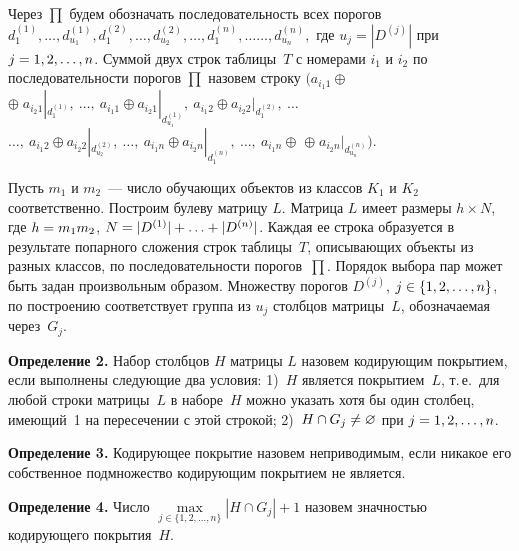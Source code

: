 \begin{multicols}{2}
Через $\prod$ будем обозначать последовательность всех порогов
$d^{(1)}_1,\ldots ,d^{(1)}_{u_1}, d^{(2)}_1,\ldots ,d^{(2)}_{u_2},\ldots , 
d^{(n)}_1,\ldots$\linebreak $\ldots ,d^{(n)}_{u_n},$ 
где 
$u_j = |D^{(j)}|$ при $j\hm=1,2,\ldots ,n$. Суммой двух строк таблицы~$T$ 
с номерами $i_1$ и $i_2$ по последовательности порогов
$\prod$ назовем строку
$(a_{{i_1}1} \oplus$\linebreak $\oplus\;a_{{i_2}1} |_{d^{(1)}_1},\ \ldots ,\ a_{{i_1}1} \oplus 
a_{{i_2}1} |_{d^{(1)}_{u_1}},\
a_{{i_1}2} \oplus a_{{i_2}2} |_{d^{(2)}_1},\ \ldots$\linebreak 
$\ldots ,\ a_{{i_1}2} \oplus a_{{i_2}2} |_{d^{(2)}_{u_2}},\
\ldots ,\
a_{{i_1}n} \oplus a_{{i_2}n} |_{d^{(n)}_{1}},\ \ldots ,\ a_{{i_1}n} \oplus $\linebreak
$\oplus\;a_{{i_2}n} |_{d^{(n)}_{u_n}})$.

Пусть $m_1$ и $m_2$~--- число обучающих объектов из классов $K_1$ и
$K_2$ соответственно. Построим булеву матрицу $L$. Матрица $L$ имеет
размеры $h \times N$, где $h \hm= m_1m_2$, $N\hm=|D^{(1)}|+\ldots +|D^{(n)}|$.
Каждая ее строка образуется в результате попарного сложения строк
таблицы~$T$, описывающих объекты из разных классов, по
последовательности порогов~$\prod$. Порядок выбора пар может быть
задан произвольным образом. Множеству порогов $D^{(j)}$, $j \hm\in
\{1,2,\ldots ,n\}$, по построению соответствует группа из $u_j$ столбцов
мат\-ри\-цы~$L$, обозначаемая через~$G_j$.

\smallskip

\noindent
\textbf{Определение 2.} Набор столбцов $H$ матрицы $L$ назовем
кодирующим покрытием, если выполнены следующие два условия: 1)~$H$
является покрытием~$L$, т.\,е.\ для любой строки матрицы~$L$ в наборе~$H$ 
можно указать хотя бы один столбец, имеющий~1 на пересечении с
этой строкой; 2)~$H \cap G_j \hm\neq \varnothing$ при $j\hm=1,2,\ldots ,n$.

\smallskip

\noindent
\textbf{Определение 3.} Кодирующее покрытие назовем неприводимым,
если никакое его собственное подмножество кодирующим покрытием не
является.

\smallskip

\noindent
\textbf{Определение 4.} Число $\max\limits_{j\in\{1,2,\ldots ,n\}} |H \cap
G_j|+1$ назовем значностью кодирующего покрытия~$H$.


\end{multicols}
